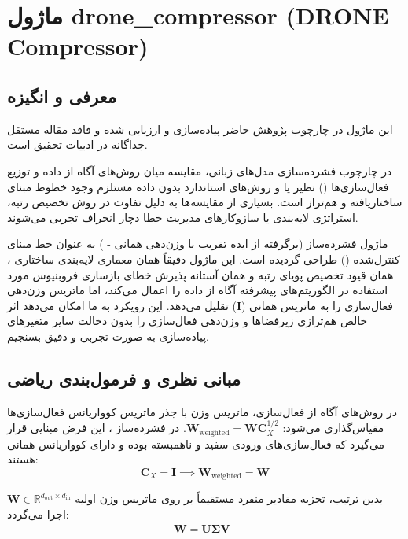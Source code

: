 \section{ماژول drone\_compressor (DRONE Compressor)}
\label{sec:module_drone_compressor}

\subsection{معرفی و انگیزه}
این ماژول در چارچوب پژوهش حاضر پیاده‌سازی و ارزیابی شده و فاقد مقاله مستقل جداگانه در ادبیات تحقیق است.

در چارچوب فشرده‌سازی مدل‌های زبانی، مقایسه میان روش‌های آگاه از داده و توزیع فعال‌سازی‌ها () نظیر  یا  و روش‌های استاندارد بدون داده مستلزم وجود خطوط مبنای ساختاریافته و هم‌تراز است. بسیاری از مقایسه‌ها به دلیل تفاوت در روش تخصیص رتبه، استراتژی لایه‌بندی یا سازوکارهای مدیریت خطا دچار انحراف تجربی می‌شوند.

ماژول فشرده‌ساز  (برگرفته از ایده تقریب با وزن‌دهی همانی - ) به عنوان خط مبنای کنترل‌شده () طراحی گردیده است. این ماژول دقیقاً همان معماری لایه‌بندی ساختاری ، همان قیود تخصیص پویای رتبه و همان آستانه پذیرش خطای بازسازی فروبنیوس مورد استفاده در الگوریتم‌های پیشرفته آگاه از داده را اعمال می‌کند، اما ماتریس وزن‌دهی فعال‌سازی را به ماتریس همانی ($\mathbf{I}$) تقلیل می‌دهد. این رویکرد به ما امکان می‌دهد اثر خالص هم‌ترازی زیرفضاها و وزن‌دهی فعال‌سازی را بدون دخالت سایر متغیرهای پیاده‌سازی به صورت تجربی و دقیق بسنجیم.

\subsection{مبانی نظری و فرمول‌بندی ریاضی}
در روش‌های آگاه از فعال‌سازی، ماتریس وزن با جذر ماتریس کوواریانس فعال‌سازی‌ها مقیاس‌گذاری می‌شود: $\mathbf{W}_{\text{weighted}} = \mathbf{W} \mathbf{C}_X^{1/2}$. در فشرده‌ساز ، این فرض مبنایی قرار می‌گیرد که فعال‌سازی‌های ورودی سفید و ناهمبسته بوده و دارای کوواریانس همانی هستند:
\begin{equation}
\mathbf{C}_X = \mathbf{I} \implies \mathbf{W}_{\text{weighted}} = \mathbf{W}
\end{equation}

بدین ترتیب، تجزیه مقادیر منفرد مستقیماً بر روی ماتریس وزن اولیه $\mathbf{W} \in \mathbb{R}^{d_{\text{out}} \times d_{\text{in}}}$ اجرا می‌گردد:
\begin{equation}
\mathbf{W} = \mathbf{U} \mathbf{\Sigma} \mathbf{V}^\top
\end{equation}

